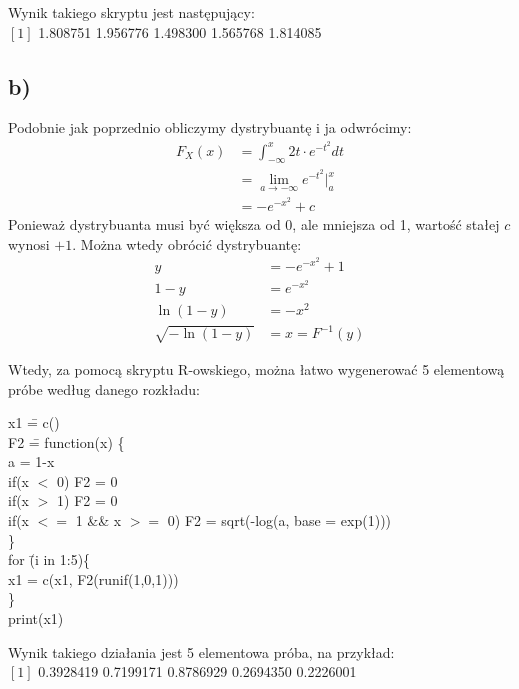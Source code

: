 \documentclass{article}
\begin{document}
Wynik takiego skryptu jest następujący: \\
$[1]$ 1.808751 1.956776 1.498300 1.565768 1.814085

\subsection*{b)}
Podobnie jak poprzednio obliczymy dystrybuantę i ja odwrócimy:
\begin{align*}
F_X(x) & = \int_{-\infty}^{x} 2t \cdot e^{-t^2} dt \\
& = \lim_{a \rightarrow -\infty} e^{-t^2} \Big\vert_{a}^x \\
& = -e^{-x^2} + c
\end{align*}
Ponieważ dystrybuanta musi być większa od 0, ale mniejsza od 1, wartość stałej $c$ wynosi $+1$. Można wtedy obrócić dystrybuantę:
\begin{align*}
y & = -e^{-x^2} +1\\
1-y &= e^{-x^2} \\
\ln{(1-y)} &= -x^2 \\
\sqrt{-\ln{(1-y)}} &= x = F^{-1}(y)
\end{align*}

Wtedy, za pomocą skryptu R-owskiego, można łatwo wygenerować 5 elementową próbe według danego rozkładu:
{\selectfont
\begin{tabbing}
x1 \= = c() \\
F2 \= = function(x) \{ \+ \\
	a = 1-x \\
	if(x $<$ 0) { F2 = 0 } \\
	if(x $>$ 1) { F2 = 0 } \\
	if(x $<=$ 1 \&\& x $>=$ 0) {F2 = sqrt(-log(a, base = exp(1)))} \- \\
\} \\
for \= (i in 1:5)\{ \+ \\
	x1 = c(x1, F2(runif(1,0,1))) \- \\
\} \\
print(x1)
\end{tabbing}
}
Wynik takiego działania jest 5 elementowa próba, na przykład: \\
$[ 1 ]$ 0.3928419 0.7199171 0.8786929 0.2694350 0.2226001
\end{document}
